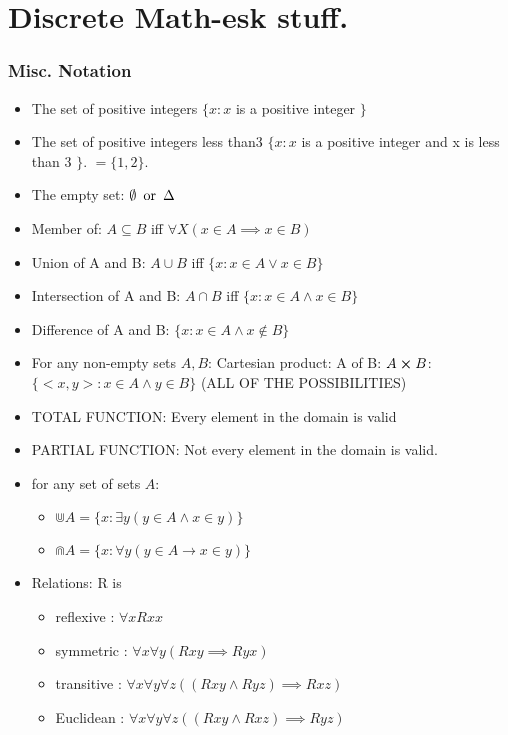 
\chapter{Discrete Math-esk stuff.}
\subsection{Misc. Notation}

\begin{itemize}
\item The set of positive integers $\{ x : x$ is a positive integer $\}$ 
\item The set of positive integers less than3 $\{ x : x $ is a positive integer and x is less than 3 $\}$. $= \{1,2\}$. 
\item The empty set: $\emptyset \operatorname{\text{ or }} \Delta$ 
\item Member of: $A \subseteq B$ iff $\forall X (x \in A \implies x \in B )$ 
\item Union of A and B: $A \cup B $ iff $\{ x : x \in A \lor x \in B \}$
\item Intersection of A and B: $A \cap B $ iff $\{ x : x \in A \land x \in B \}$
\item Difference of A and B: $\{ x : x \in A \land x \not \in B \}$
\item For any non-empty sets $A,B$:
Cartesian product: A of B: $A \cross B$: $\{<x,y>: x \in A \land y \in B \}$ (ALL OF THE POSSIBILITIES)
\item TOTAL FUNCTION: Every element in the domain is valid
\item PARTIAL FUNCTION: Not every element in the domain is valid.
\item for any set of sets $A$:
\begin{itemize}
\item $\Cup A = \{ x : \exists y ( y \in A \land x \in y ) \}$ 
\item $\Cap A = \{ x : \forall y (y \in A \to x \in y )\}$ 
\end{itemize}
\item Relations: R is 
\begin{itemize}
\item reflexive : $\forall x Rxx$
\item symmetric : $\forall x \forall y (Rxy \implies Ryx)$
\item transitive : $\forall x \forall y \forall z ((Rxy \land Ryz) \implies Rxz)$
\item Euclidean : $\forall x \forall y \forall z ((Rxy \land Rxz ) \implies Ryz)$

\end{itemize}
\end{itemize}
